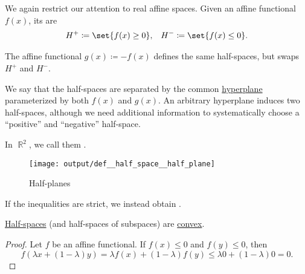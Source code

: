 \begin{definition}\label{def:half_space}
  We again restrict our attention to real affine spaces. Given an affine functional \( f(x) \), its  are
  \begin{align*}
    H^+ \coloneqq \set{ f(x) \geq 0 },
    &&
    H^- \coloneqq \set{ f(x) \leq 0 }.
  \end{align*}

  The affine functional \( g(x) \coloneqq -f(x) \) defines the same half-spaces, but swaps \( H^+ \) and \( H^- \).

  We say that the half-spaces are separated by the common \hyperref[def:affine_hyperplane]{hyperplane} parameterized by both \( f(x) \) and \( g(x) \). An arbitrary hyperplane induces two half-spaces, although we need additional information to systematically choose a \enquote{positive} and \enquote{negative} half-space.

  In \( \BbbR^2 \), we call them .

  \begin{figure}[!ht]
    \centering
    \texttt{[image: output/def\_\_half\_space\_\_half\_plane]}
    \caption{Half-planes}\label{fig:def:half_space/half_plane}
  \end{figure}

  If the inequalities are strict, we instead obtain .
\end{definition}

\begin{proposition}\label{thm:half_spaces_are_convex}
  \hyperref[def:half_space]{Half-spaces} (and half-spaces of subspaces) are \hyperref[def:convex_hull]{convex}.
\end{proposition}
\begin{proof}
  Let \( f \) be an affine functional. If \( f(x) \leq 0 \) and \( f(y) \leq 0 \), then
  \begin{equation*}
    f(\lambda x + (1 - \lambda) y)
    =
    \lambda f(x) + (1 - \lambda) f(y)
    \leq
    \lambda 0 + (1 - \lambda) 0
    =
    0.
  \end{equation*}
\end{proof}

